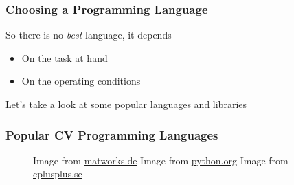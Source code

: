 \documentclass[xetex,professionalfont]{beamer}
\begin{document}

\begin{frame}
\frametitle{Choosing a Programming Language}

So there is no \textit{best} language, it depends
\begin{itemize}
	\item On the task at hand %
	\item On the operating conditions %
\end{itemize}

\medskip
Let's take a look at some popular languages and libraries

\end{frame}


\begin{frame}
\frametitle{Popular CV Programming Languages}

\begin{figure}
\centering
{
	{\centering Image from \url{matworks.de}}}\quad
{
	{\centering Image from \url{python.org}}}\quad
{
	{\centering Image from \url{cplusplus.se}}}
\end{figure}

\end{frame}

\end{document}
